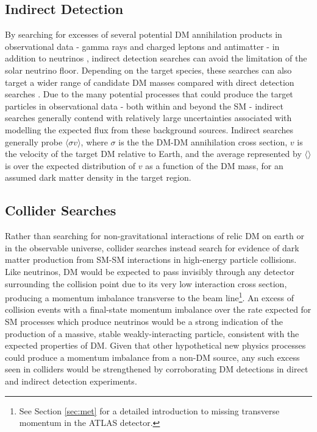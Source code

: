 \subsection{Indirect Detection}

By searching for excesses of several potential DM annihilation products in observational data - gamma rays and charged leptons and antimatter - in addition to neutrinos \cite{conrad2014indirect, pdg_2018}, indirect detection searches can avoid the limitation of the solar neutrino floor. Depending on the target species, these searches can also target a wider range of candidate DM masses compared with direct detection searches \cite{pdg_2018}. Due to the many potential processes that could produce the target particles in observational data - both within and beyond the SM - indirect searches generally contend with relatively large uncertainties associated with modelling the expected flux from these background sources. Indirect searches generally probe \(\langle \sigma v \rangle\), where \(\sigma\) is the the DM-DM annihilation cross section, \(v\) is the velocity of the target DM relative to Earth, and the average represented by \(\langle\rangle\) is over the expected distribution of \(v\) as a function of the DM mass, for an assumed dark matter density in the target region. 

\subsection{Collider Searches}

Rather than searching for non-gravitational interactions of relic DM on earth or in the observable universe, collider searches \cite{DM_colliders} instead search for evidence of dark matter production from SM-SM interactions in high-energy particle collisions. Like neutrinos, DM would be expected to pass invisibly through any detector surrounding the collision point due to its very low interaction cross section, producing a momentum imbalance transverse to the beam line\footnote{See Section \ref{sec:met} for a detailed introduction to missing transverse momentum in the ATLAS detector.}. An excess of collision events with a final-state momentum imbalance over the rate expected for SM processes which produce neutrinos would be a strong indication of the production of a massive, stable weakly-interacting particle, consistent with the expected properties of DM. Given that other hypothetical new physics processes \cite{add_1998,dark_energy_lhc} could produce a momentum imbalance from a non-DM source, any such excess seen in colliders would be strengthened by corroborating DM detections in direct and indirect detection experiments. 

